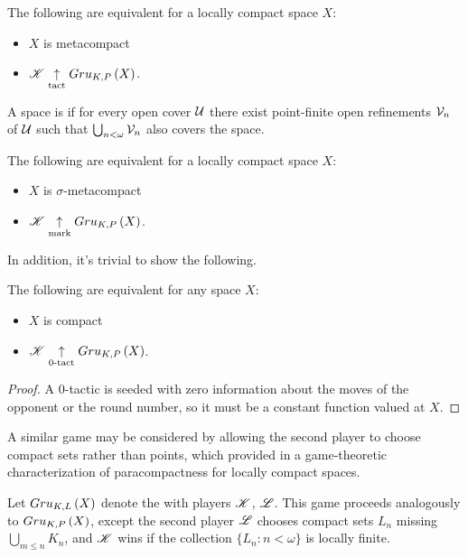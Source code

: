 \begin{thm}
  The following are equivalent for a locally compact space $X$:
    \begin{itemize}
      \item $X$ is metacompact
      \item $\mathscr{K} \underset{\text{tact}}{\uparrow} Gru_{K,P}\left({X}\right)$.
    \end{itemize}
\end{thm}

\begin{defn}
  A space is  if for every open cover $\mathcal{U}$ there
  exist point-finite open refinements $\mathcal{V}_n$ of $\mathcal{U}$ such that
  $\bigcup_{n<\omega}\mathcal{V}_n$ also covers the space.
\end{defn}

\begin{thm}
  The following are equivalent for a locally compact space $X$:
    \begin{itemize}
      \item $X$ is $\sigma$-metacompact
      \item $\mathscr{K} \underset{\text{mark}}{\uparrow} Gru_{K,P}\left({X}\right)$.
    \end{itemize}
\end{thm}

In addition, it's trivial to show the following.

\begin{prop}
  The following are equivalent for any space $X$:
    \begin{itemize}
      \item $X$ is compact
      \item $\mathscr{K} \underset{0\text{-tact}}{\uparrow} Gru_{K,P}\left({X}\right)$.
    \end{itemize}
\end{prop}

\begin{proof}
  A $0$-tactic is seeded with zero information about the moves of the opponent
  or the round number, so it must be a constant function valued at $X$.
\end{proof}

A similar game may be considered by allowing the second player to choose
compact sets rather than points, which provided in \cite{MR858337}
a game-theoretic characterization of paracompactness for locally compact
spaces.

\begin{game}
  Let $Gru_{K,L}\left({X}\right)$ denote the 
  with players $\mathscr{K}$, $\mathscr{L}$. This game proceeds analogously to
  $Gru_{K,P}\left({X}\right)$, except the second player $\mathscr{L}$ chooses compact sets $L_n$
  missing $\bigcup_{m\leq n}K_n$,
  and $\mathscr{K}$ wins if the collection $\{L_n:n<\omega\}$ is locally finite.
\end{game}

